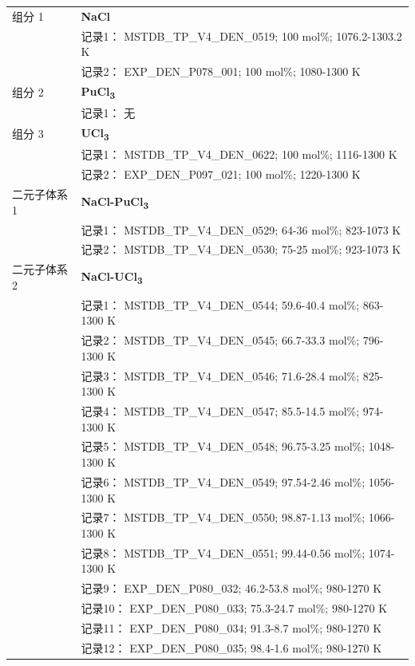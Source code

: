 \documentclass[12pt]{article}
\begin{document}
{\begin{longtable}[]{@{}
  >{\raggedright\arraybackslash}p{}
  >{\raggedright\arraybackslash}p{}@{}}
组分 1  & \textbf{NaCl} \\
 & 记录1： MSTDB\_TP\_V4\_DEN\_0519; 100 mol\%; 1076.2-1303.2 K \\
 & 记录2： EXP\_DEN\_P078\_001; 100 mol\%; 1080-1300 K  \\

组分 2 & \textbf{PuCl\textsubscript{3}} \\
 & 记录1： 无 \\
组分 3  & \textbf{UCl\textsubscript{3}} \\
 & 记录1： MSTDB\_TP\_V4\_DEN\_0622; 100 mol\%; 1116-1300 K \\
 & 记录2： EXP\_DEN\_P097\_021; 100 mol\%; 1220-1300 K  \\

二元子体系 1  & \textbf{NaCl-PuCl\textsubscript{3}} \\
 & 记录1： MSTDB\_TP\_V4\_DEN\_0529; 64-36 mol\%; 823-1073 K \\
 & 记录2： MSTDB\_TP\_V4\_DEN\_0530; 75-25 mol\%; 923-1073 K  \\

二元子体系 2  & \textbf{NaCl-UCl\textsubscript{3}} \\
 & 记录1： MSTDB\_TP\_V4\_DEN\_0544; 59.6-40.4 mol\%; 863-1300 K \\
 & 记录2： MSTDB\_TP\_V4\_DEN\_0545; 66.7-33.3 mol\%; 796-1300 K \\
 & 记录3： MSTDB\_TP\_V4\_DEN\_0546; 71.6-28.4 mol\%; 825-1300 K \\
 & 记录4： MSTDB\_TP\_V4\_DEN\_0547; 85.5-14.5 mol\%; 974-1300 K \\
 & 记录5： MSTDB\_TP\_V4\_DEN\_0548; 96.75-3.25 mol\%; 1048-1300 K \\
 & 记录6： MSTDB\_TP\_V4\_DEN\_0549; 97.54-2.46 mol\%; 1056-1300 K \\
 & 记录7： MSTDB\_TP\_V4\_DEN\_0550; 98.87-1.13 mol\%; 1066-1300 K \\
 & 记录8： MSTDB\_TP\_V4\_DEN\_0551; 99.44-0.56 mol\%; 1074-1300 K \\
 & 记录9： EXP\_DEN\_P080\_032; 46.2-53.8 mol\%; 980-1270 K \\
 & 记录10： EXP\_DEN\_P080\_033; 75.3-24.7 mol\%; 980-1270 K \\
 & 记录11： EXP\_DEN\_P080\_034; 91.3-8.7 mol\%; 980-1270 K \\
 & 记录12： EXP\_DEN\_P080\_035; 98.4-1.6 mol\%; 980-1270 K  \\


\end{longtable}}
\end{document}
